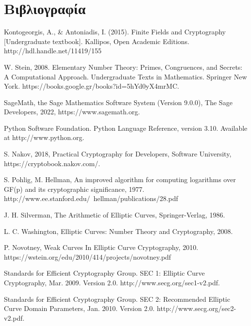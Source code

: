 \documentclass[oneside,a4paper]{article}
\begin{document}
\pagebreak
\section{Βιβλιογραφία}
\vspace*{0.5cm}
\begingroup
\renewcommand{\section}[2]{}%
\begin{thebibliography}{}


	Kontogeorgis, A., \& Antoniadis, I. (2015). Finite Fields and Cryptography [Undergraduate textbook]. Kallipos, Open Academic Editions. http://hdl.handle.net/11419/155 

	W. Stein, 2008. Elementary Number Theory: Primes, Congruences, and Secrets: A Computational Approach. Undergraduate Texts in Mathematics. Springer New York. https://books.google.gr/books?id=5hYd0yX4mrMC.

	SageMath, the Sage Mathematics Software System (Version 9.0.0), The Sage Developers, 2022, https://www.sagemath.org.

	Python Software Foundation. Python Language Reference, version 3.10. Available at http://www.python.org.

	S. Nakov, 2018, Practical Cryptography for Developers, Software University, https://cryptobook.nakov.com/.

	S. Pohlig, M. Hellman, An improved algorithm for computing logarithms over GF(p) and its cryptographic significance, 1977. http://www.ee.stanford.edu/~hellman/publications/28.pdf

	J. H. Silverman, The Arithmetic of Elliptic Curves, Springer-Verlag, 1986.

	L. C. Washington, Elliptic Curves: Number Theory and Cryptography, 2008.

	P. Novotney, Weak Curves In Elliptic Curve Cryptography, 2010. https://wstein.org/edu/2010/414/projects/novotney.pdf


	Standards for Efficient Cryptography Group. SEC 1: Elliptic Curve Cryptography, Mar. 2009. Version 2.0. http://www.secg.org/sec1-v2.pdf.

	Standards for Efficient Cryptography Group. SEC 2: Recommended Elliptic Curve Domain Parameters, Jan. 2010. Version 2.0. http://www.secg.org/sec2-v2.pdf.


\end{thebibliography}
\end{document}
